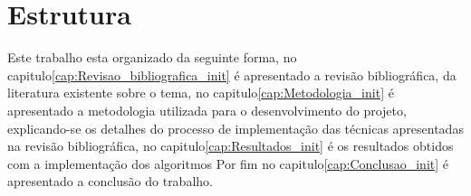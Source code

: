 \section{Estrutura}
\label{sec:Introducao_structure}

Este trabalho esta organizado da seguinte forma, 
no capitulo\ref{cap:Revisao_bibliografica_init} é apresentado a revisão bibliográfica, da literatura existente sobre o tema, 
no capitulo\ref{cap:Metodologia_init} é apresentado a metodologia utilizada para o desenvolvimento do projeto, 
explicando-se os detalhes do processo de implementação das técnicas apresentadas na revisão bibliográfica,
no capitulo\ref{cap:Resultados_init} é os resultados obtidos com a implementação dos algoritmos
Por fim no capitulo\ref{cap:Conclusao_init} é apresentado a conclusão do trabalho.
